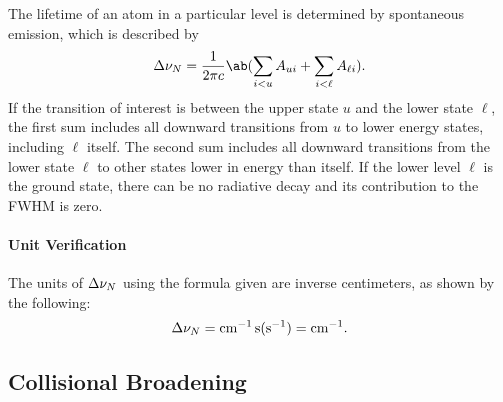 The lifetime of an atom in a particular level is determined by spontaneous emission, which is described by \cite[133]{hansonSpectroscopyOpticalDiagnostics2016}
\begin{equation*}
    \adif{\nu}_N = \frac{1}{2\pi c}\ab(\sum_{i < u} A_{ui} + \sum_{i < \ell} A_{\ell i}).
\end{equation*}
If the transition of interest is between the upper state $u$ and the lower state $\ell$, the first sum includes all downward transitions from $u$ to lower energy states, including $\ell$ itself.
The second sum includes all downward transitions from the lower state $\ell$ to other states lower in energy than itself.
If the lower level $\ell$ is the ground state, there can be no radiative decay and its contribution to the FWHM is zero.

\paragraph{Unit Verification}

The units of $\adif{\nu}_N$ using the formula given are inverse centimeters, as shown by the following:
\begin{equation*}
    \adif{\nu}_N = \unit{cm^{-1}.s}(\unit{s^{-1}}) = \unit{cm^{-1}}.
\end{equation*}

\subsection{Collisional Broadening}

